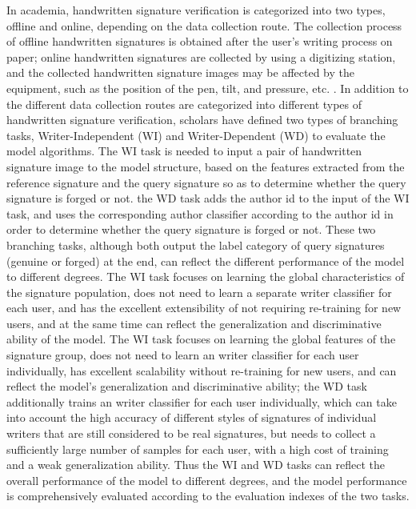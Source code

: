 In academia, handwritten signature verification is categorized into two types, offline and online, depending on the data collection route. The collection process of offline handwritten signatures is obtained after the user's writing process on paper; online handwritten signatures are collected by using a digitizing station, and the collected handwritten signature images may be affected by the equipment, such as the position of the pen, tilt, and pressure, etc. \cite{2}. In addition to the different data collection routes are categorized into different types of handwritten signature verification, scholars have defined two types of branching tasks, Writer-Independent (WI) and Writer-Dependent (WD) to evaluate the model algorithms. The WI task is needed to input a pair of handwritten signature image to the model structure, based on the features extracted from the reference signature and the query signature so as to determine whether the query signature is forged or not. the WD task adds the author id to the input of the WI task, and uses the corresponding author classifier according to the author id in order to determine whether the query signature is forged or not. These two branching tasks, although both output the label category of query signatures (genuine or forged) at the end, can reflect the different performance of the model to different degrees. The WI task focuses on learning the global characteristics of the signature population, does not need to learn a separate writer classifier for each user, and has the excellent extensibility of not requiring re-training for new users, and at the same time can reflect the generalization and discriminative ability of the model. The WI task focuses on learning the global features of the signature group, does not need to learn an writer classifier for each user individually, has excellent scalability without re-training for new users, and can reflect the model's generalization and discriminative ability; the WD task additionally trains an writer classifier for each user individually, which can take into account the high accuracy of different styles of signatures of individual writers that are still considered to be real signatures, but needs to collect a sufficiently large number of samples for each user, with a high cost of training and a weak generalization ability. Thus the WI and WD tasks can reflect the overall performance of the model to different degrees, and the model performance is comprehensively evaluated according to the evaluation indexes of the two tasks.

